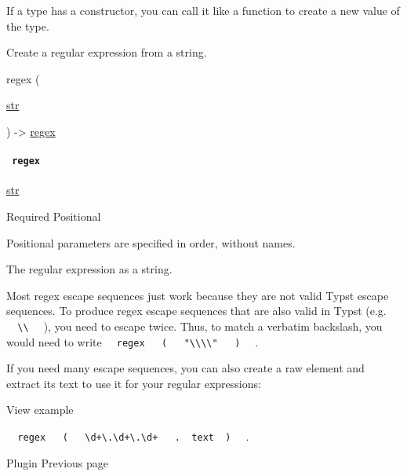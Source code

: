 \label{constructor-constructor-tooltip}
If a type has a constructor, you can call it like a function to create a
new value of the type.

Create a regular expression from a string.

{ regex } (

{ \href{/docs/reference/foundations/str/}{str} }

) -\textgreater{} \href{/docs/reference/foundations/regex/}{regex}

\paragraph{\texorpdfstring{\texttt{\ regex\ }}{ regex }}\label{constructor-regex}

\href{/docs/reference/foundations/str/}{str}

{Required} {{ Positional }}

\label{constructor-regex-positional-tooltip}
Positional parameters are specified in order, without names.

The regular expression as a string.

Most regex escape sequences just work because they are not valid Typst
escape sequences. To produce regex escape sequences that are also valid
in Typst (e.g.
\texttt{\ }{\texttt{\ \textbackslash{}\textbackslash{}\ }}\texttt{\ } ),
you need to escape twice. Thus, to match a verbatim backslash, you would
need to write
\texttt{\ }{\texttt{\ regex\ }}\texttt{\ }{\texttt{\ (\ }}\texttt{\ }{\texttt{\ "\textbackslash{}\textbackslash{}\textbackslash{}\textbackslash{}"\ }}\texttt{\ }{\texttt{\ )\ }}\texttt{\ }
.

If you need many escape sequences, you can also create a raw element and
extract its text to use it for your regular expressions:


View example

\texttt{\ }{\texttt{\ regex\ }}\texttt{\ }{\texttt{\ (\ }}\texttt{\ }{\texttt{\ \textasciigrave{}\textbackslash{}d+\textbackslash{}.\textbackslash{}d+\textbackslash{}.\textbackslash{}d+\textasciigrave{}\ }}\texttt{\ }{\texttt{\ .\ }}\texttt{\ text\ }{\texttt{\ )\ }}\texttt{\ }
.

\href{/docs/reference/foundations/plugin/}{\pandocbounded{}}

{ Plugin } { Previous page }

